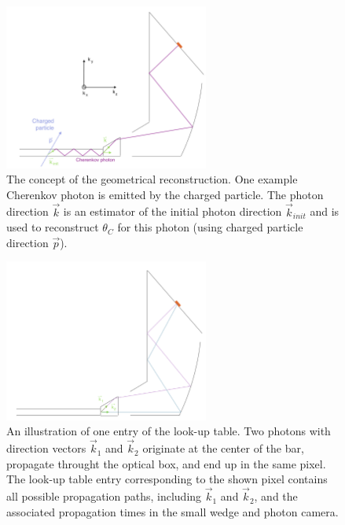 \begin{figure}[!h]
\centering
\includegraphics[clip, trim=0.0cm 0.0cm 0cm 0.3cm,width=0.6\textwidth]{pics/lut3.png}
\caption{\label{pic:lut1}
The concept of the geometrical reconstruction. One example Cherenkov photon is emitted by the charged particle. The photon direction $\vec k$ is an estimator of the initial photon direction $\vec k_{init}$ and is used to reconstruct $\theta_{C}$ for this photon (using charged particle direction $\vec p$). 
}
\end{figure}

\begin{figure}[!h]
\centering
\includegraphics[clip, trim=0.cm 0.cm 0cm 0.3cm,width=0.6\textwidth]{pics/lut1.png}
\caption{\label{pic:lut2}
An illustration of one entry of the look-up table. Two photons with direction vectors $\vec k_{1}$ and $\vec k_{2}$ originate at the center of the bar, propagate throught the optical box, and end up in the same pixel. The look-up table entry corresponding to the shown pixel contains all possible propagation paths, including $\vec k_{1}$ and $\vec k_{2}$, and the associated propagation times in the small wedge and photon camera.
}
\end{figure}

